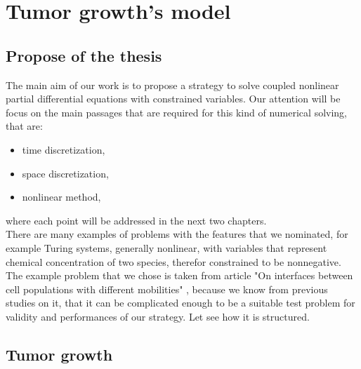 \chapter{Tumor growth's model}
\section{Propose of the thesis}
The main aim of our work is to propose a strategy to solve coupled nonlinear partial differential equations with constrained variables. Our attention will be focus on the main passages that are required for this kind of numerical solving, that are:
\begin{itemize}
	\item time discretization,
	\item space discretization,
	\item nonlinear method,
\end{itemize}  
where each point will be addressed in the next two chapters. \\
There are many examples of problems with the features that we nominated, for example Turing systems, generally nonlinear, with variables that represent chemical concentration of two species, therefor constrained to be nonnegative. \\
The example problem that we chose is taken from article "On interfaces between cell populations with different mobilities" \cite{tumor_growth}, because we know from previous studies on it, that it can be complicated enough to be a suitable test problem for validity and performances of our strategy.
Let see how it is structured. 
\section{Tumor growth}
